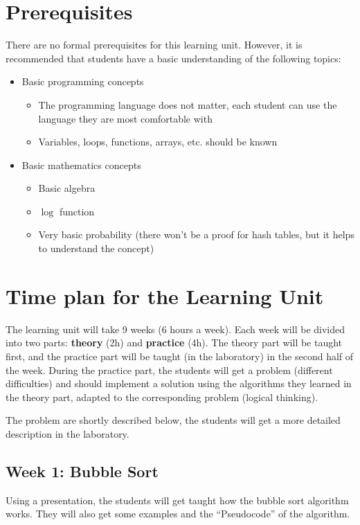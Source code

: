 \documentclass[10pt, oneside]{article}
\theoremstyle{remark}
\begin{document}
\section{Prerequisites}
There are no formal prerequisites for this learning unit. However, it is recommended that students have a basic understanding of the following topics:
\begin{itemize}
  \item Basic programming concepts
  \begin{itemize}
    \item The programming language does not matter, each student can use the language they are most comfortable with
    \item Variables, loops, functions, arrays, etc. should be known
  \end{itemize}
  \item Basic mathematics concepts
  \begin{itemize}
    \item Basic algebra
    \item $\log$ function
    \item Very basic probability (there won't be a proof for hash tables, but it helps to understand the concept)
  \end{itemize}
\end{itemize}

\section{Time plan for the Learning Unit}
The learning unit will take 9 weeks (6 hours a week). Each week will be divided into two parts: \textbf{theory} (2h) and \textbf{practice} (4h). The theory part will be taught first, and the practice part will be taught (in the laboratory) in the second half of the week. During the practice part, the students will get a problem (different difficulties) and should implement a solution using the algorithms they learned in the theory part, adapted to the corresponding problem (logical thinking).

The problem are shortly described below, the students will get a more detailed description in the laboratory.

\subsection{Week 1: Bubble Sort}
Using a presentation, the students will get taught how the bubble sort algorithm works. They will also get some examples and the \enquote{Pseudocode} of the algorithm. 
\end{document}
